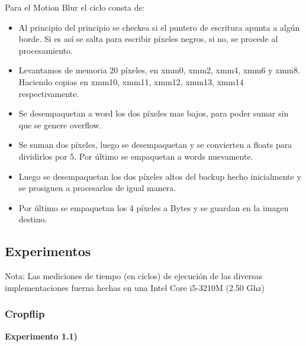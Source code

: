 \documentclass[a4paper]{article}
\begin{document}
Para el Motion Blur el ciclo consta de:
\begin{itemize}
\item Al principio del principio se checkea si el puntero de escritura apunta a alg\'{u}n borde. Si es as\'{i} se salta para escribir p\'{i}xeles negros, si no, se procede al procesamiento. \\
\item Levantamos de memoria 20 p\'{i}xeles, en xmm0, xmm2, xmm4, xmm6 y xmm8. Haciendo copias en xmm10, xmm11, xmm12, xmm13, xmm14 respectivamente. \\
\item Se desempaquetan a word los dos p\'{i}xeles mas bajos, para poder sumar sin que se genere overflow. \\
\item Se suman dos p\'{i}xeles, luego se desempaquetan y se convierten a floats para dividirlos por 5. Por \'{u}ltimo se empaquetan a words nuevamente. \\
\item Luego se desempaquetan los dos p\'{i}xeles altos del backup hecho inicialmente y se prosiguen a procesarlos de igual manera. \\
\item Por \'{u}ltimo se empaquetan los 4 p\'{i}xeles a Bytes y se guardan en la imagen destino.
\end{itemize}

\newpage

\subsection{Experimentos}

Nota: Las mediciones de tiempo (en ciclos) de ejecuci\'{o}n de las diversas implementaciones fuerna hechas en una Intel Core i5-3210M (2.50 Ghz)

\subsubsection{Cropflip}

\textbf{Experimento 1.1)}\\
\end{document}
